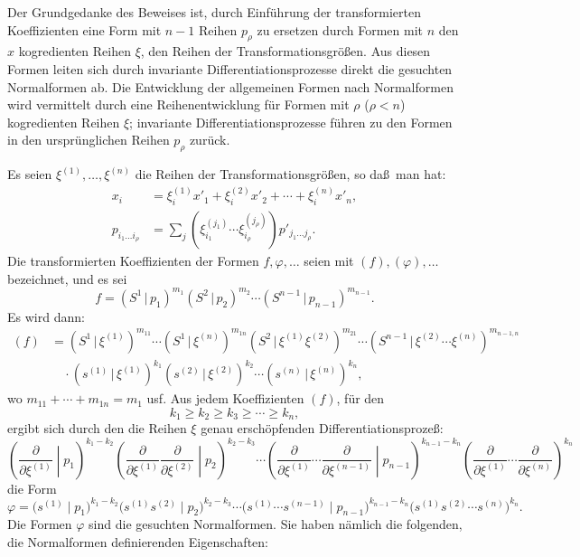 \documentclass[11pt]{article}
\providecommand{\pair}[2]{(#1\,|\,#2)}
\begin{document}
Der Grundgedanke des Beweises ist, durch Einf\"uhrung der transformierten Koeffizienten eine Form mit $n-1$ Reihen $p_\rho$ zu ersetzen durch Formen mit $n$ den $x$ kogredienten Reihen $\xi$, den Reihen der Transformationsgr\"o\ss en. Aus diesen Formen leiten sich durch invariante Differentiationsprozesse direkt die gesuchten Normalformen ab. Die Entwicklung der allgemeinen Formen nach Normalformen wird vermittelt durch eine Reihenentwicklung f\"ur Formen mit $\rho$ ($\rho<n$) kogredienten Reihen $\xi$; invariante Differentiationsprozesse f\"uhren zu den Formen in den urspr\"unglichen Reihen $p_\rho$ zur\"uck.

Es seien $\xi^{(1)},\ldots,\xi^{(n)}$ die Reihen der Transformationsgr\"o\ss en, so da\ss\ man hat:
\begin{equation}
\begin{aligned}
x_i&=\xi_i^{(1)}x'_1+\xi_i^{(2)}x'_2+\cdots+\xi_i^{(n)}x'_n,\\
p_{i_1\ldots i_\rho}&=\sum_j(\xi_{i_1}^{(j_1)}\cdots \xi_{i_\rho}^{(j_\rho)})p'_{j_1\ldots j_\rho}.
\end{aligned}
\tag{47}
\end{equation}
Die transformierten Koeffizienten der Formen $f,\varphi,\ldots$ seien mit $(f),(\varphi),\ldots$ bezeichnet, und es sei
\[
 f=\pair{S^1}{p_1}^{m_1}\pair{S^2}{p_2}^{m_2}\cdots\pair{S^{n-1}}{p_{n-1}}^{m_{n-1}}.
\]
Es wird dann:
\begin{equation}
\begin{aligned}
(f)&=\pair{S^1}{\xi^{(1)}}^{m_{11}}\cdots\pair{S^1}{\xi^{(n)}}^{m_{1n}}
\pair{S^2}{\xi^{(1)}\xi^{(2)}}^{m_{21}}\cdots
\pair{S^{n-1}}{\xi^{(2)}\cdots\xi^{(n)}}^{m_{n-1,n}}\\
&\quad\cdot\pair{s^{(1)}}{\xi^{(1)}}^{k_1}\pair{s^{(2)}}{\xi^{(2)}}^{k_2}\cdots\pair{s^{(n)}}{\xi^{(n)}}^{k_n},
\end{aligned}
\tag{48}
\end{equation}
wo $m_{11}+\cdots+m_{1n}=m_1$ usf. Aus jedem Koeffizienten $(f)$, f\"ur den
\begin{equation}
 k_1\ge k_2\ge k_3\ge\cdots\ge k_n,
\tag{49}
\end{equation}
ergibt sich durch den die Reihen $\xi$ genau ersch\"opfenden Differentiationsproze\ss:
\begin{equation}
\left(\frac{\partial}{\partial\xi^{(1)}}\middle|p_1\right)^{k_1-k_2}
\left(\frac{\partial}{\partial\xi^{(1)}}\frac{\partial}{\partial\xi^{(2)}}\middle|p_2\right)^{k_2-k_3}
\cdots
\left(\frac{\partial}{\partial\xi^{(1)}}\cdots\frac{\partial}{\partial\xi^{(n-1)}}\middle|p_{n-1}\right)^{k_{n-1}-k_n}
\left(\frac{\partial}{\partial\xi^{(1)}}\cdots\frac{\partial}{\partial\xi^{(n)}}\right)^{k_n}
\tag{50}
\end{equation}
die Form
\begin{equation}
 \varphi=\bigl(s^{(1)}\mid p_1\bigr)^{k_1-k_2}
 \bigl(s^{(1)}s^{(2)}\mid p_2\bigr)^{k_2-k_3}\cdots
 \bigl(s^{(1)}\cdots s^{(n-1)}\mid p_{n-1}\bigr)^{k_{n-1}-k_n}
 \bigl(s^{(1)}s^{(2)}\cdots s^{(n)}\bigr)^{k_n}.
\tag{51}
\end{equation}
Die Formen $\varphi$ sind die gesuchten Normalformen. Sie haben n\"amlich die folgenden, die Normalformen definierenden Eigenschaften:
\end{document}
